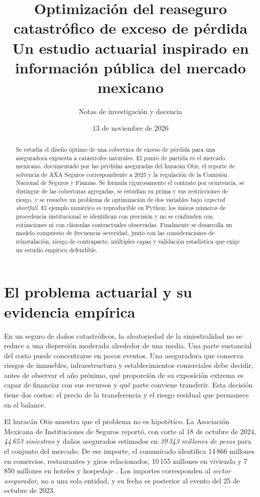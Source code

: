 \documentclass[11pt,reqno]{amsart}
\title[Reaseguro de exceso de pérdida y optimización]{Optimización del reaseguro catastrófico de exceso de pérdida\\\large Un estudio actuarial inspirado en información pública del mercado mexicano}
\author{Notas de investigación y docencia}
\date{13 de noviembre de 2026}
\theoremstyle{definition}\newtheorem{definition}[theorem]{Definición}
\theoremstyle{remark}\newtheorem{remark}[theorem]{Observación}
\begin{document}
\begin{abstract}
Se estudia el diseño óptimo de una cobertura de exceso de pérdida para una aseguradora expuesta a catástrofes naturales. El punto de partida es el mercado mexicano, documentado por las pérdidas aseguradas del huracán Otis, el reporte de solvencia de AXA Seguros correspondiente a 2025 y la regulación de la Comisión Nacional de Seguros y Fianzas. Se formula rigurosamente el contrato por ocurrencia, se distingue de las coberturas agregadas, se estudian su prima y sus restricciones de riesgo, y se resuelve un problema de optimización de dos variables bajo \emph{expected shortfall}. El ejemplo numérico es reproducible en Python; los únicos números de procedencia institucional se identifican con precisión y no se confunden con cotizaciones ni con cláusulas contractuales observadas. Finalmente se desarrolla un modelo compuesto de frecuencia--severidad, junto con las consideraciones de reinstalación, riesgo de contraparte, múltiples capas y validación estadística que exige un estudio empírico defendible.
\end{abstract}
\maketitle
\tableofcontents

\section{El problema actuarial y su evidencia empírica}
En un seguro de daños catastróficos, la aleatoriedad de la siniestralidad no se reduce a una dispersión moderada alrededor de una media. Una parte sustancial del costo puede concentrarse en pocos eventos. Una aseguradora que conserva riesgos de inmuebles, infraestructura y establecimientos comerciales debe decidir, antes de observar el año próximo, qué proporción de su exposición extrema es capaz de financiar con sus recursos y qué parte conviene transferir. Esta decisión tiene dos costos: el precio de la transferencia y el riesgo residual que permanece en el balance.

El huracán Otis muestra que el problema no es hipotético. La Asociación Mexicana de Instituciones de Seguros reportó, con corte al 18 de octubre de 2024, \emph{44\,653 siniestros} y daños asegurados estimados en \emph{39\,343 millones de pesos} para el conjunto del mercado. De ese importe, el comunicado identifica 14\,866 millones en comercios, restaurantes y giros relacionados, 10\,155 millones en vivienda y 7\,850 millones en hoteles y hospedaje \cite{AMISOtis2024}. Los importes corresponden al \emph{sector asegurador}, no a una sola entidad, y su fecha es posterior al evento del 25 de octubre de 2023.
\end{document}
